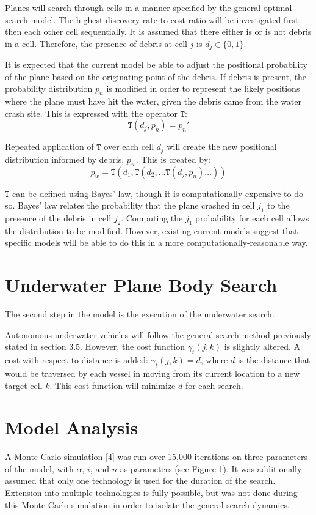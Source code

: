 \documentclass[a4paper]{article}
\begin{document}
Planes will search through cells in a manner specified by the general optimal search model. The highest discovery rate to cost ratio will be investigated first, then each other cell sequentially. It is assumed that there either is or is not debris in a cell. Therefore, the presence of debris at cell $j$ is $d_j\in \{0,1\}$.  

It is expected that the current model be able to adjust the positional probability of the plane based on the originating point of the debris. If debris is present, the probability distribution $p_n$ is modified in order to represent the likely positions where the plane must have hit the water, given the debris came from the water crash site. This is expressed with the operator $\mathtt{T}$: $$\mathtt{T}(d_j,p_n)=p_n'$$

Repeated application of $\mathtt{T}$ over each cell $d_j$ will create the new positional distribution informed by debris, $p_w$. This is created by: $$p_w=\mathtt{T}(d_1, \mathtt{T}(d_2, \ldots \mathtt{T}(d_j, p_n)\ldots))$$

$\mathtt{T}$ can be defined using Bayes' law, though it is computationally expensive to do so. Bayes' law relates the probability that the plane crashed in cell $j_1$ to the presence of the debris in cell $j_2$. Computing the $j_1$ probability for each cell allows the distribution to be modified. However, existing current models suggest that specific models will be able to do this in a more computationally-reasonable way.

\section{Underwater Plane Body Search}

The second step in the model is the execution of the underwater search. 

Autonomous underwater vehicles will follow the general search method previously stated in section 3.5. However, the cost function $\gamma_t(j,k)$ is slightly altered. A cost with respect to distance is added: $\gamma_t(j,k)=d$, where $d$ is the distance that would be traversed by each vessel in moving from its current location to a new target cell $k$. This cost function will minimize $d$ for each search. 

\section{Model Analysis}

A Monte Carlo simulation [4] was run over 15,000 iterations on three parameters of the model, with $\alpha$, $i$, and $n$ as parameters (see Figure 1). It was additionally assumed that only one technology is used for the duration of the search. Extension into multiple technologies is fully possible, but was not done during this Monte Carlo simulation in order to isolate the general search dynamics.
\end{document}
